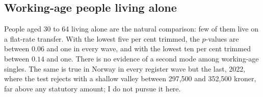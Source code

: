 

\subsection{Working-age people living alone}

People aged 30 to 64 living alone are the natural comparison: few of them live on a flat-rate transfer. With the lowest five per cent trimmed, the $p$-values are between $0.06$ and one in every wave, and with the lowest ten per cent trimmed between $0.14$ and one. There is no evidence of a second mode among working-age singles. The same is true in Norway in every register wave but the last, 2022, where the test rejects with a shallow valley between 297{,}500 and 352{,}500 kroner, far above any statutory amount; I do not pursue it here.
